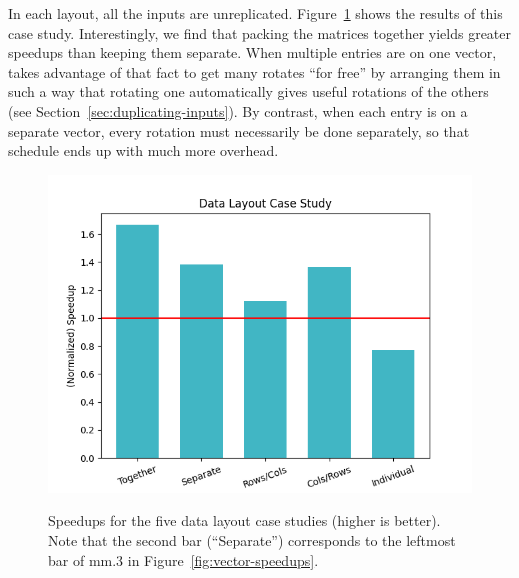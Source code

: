 In each layout, all the inputs are unreplicated.
Figure~\ref{fig:data-layout-case-study} shows the results of this case study.
Interestingly, we find that packing the matrices together yields greater speedups than keeping them separate.
When multiple entries are on one vector, \system takes advantage of that fact to get many rotates ``for free'' by arranging them in such a way that rotating one automatically gives useful rotations of the others (see Section~\ref{sec:duplicating-inputs}).
By contrast, when each entry is on a separate vector, every rotation must necessarily be done separately, so that schedule ends up with much more overhead.

\begin{figure}
    \includegraphics[width=0.7\linewidth]{figures/graphs/case_study.png}
    \caption{Speedups for the five data layout case studies (higher is better). Note that the second bar (``Separate'') corresponds to the leftmost bar of {\sf mm.3} in Figure~\ref{fig:vector-speedups}.}
    \label{fig:data-layout-case-study}
\end{figure}


